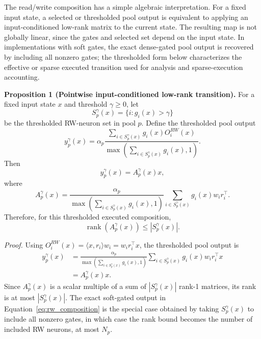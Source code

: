 \documentclass{article}
\begin{document}
The read/write composition has a simple algebraic interpretation. For a fixed input state, a selected or thresholded pool output is equivalent to applying an input-conditioned low-rank matrix to the current state. The resulting map is not globally linear, since the gates and selected set depend on the input state. In implementations with soft gates, the exact dense-gated pool output is recovered by including all nonzero gates; the thresholded form below characterizes the effective or sparse executed transition used for analysis and sparse-execution accounting.

\textbf{Proposition 1 (Pointwise input-conditioned low-rank transition).}
For a fixed input state $x$ and threshold $\gamma \ge 0$, let
\begin{equation}
    S_p^{\gamma}(x)=\{i:g_i(x)>\gamma\}
\end{equation}
be the thresholded RW-neuron set in pool $p$. Define the thresholded pool output
\begin{equation}
    y_p^{\gamma}(x)
    =
    \alpha_p
    \frac{\sum_{i\in S_p^{\gamma}(x)} g_i(x) O_i^{RW}(x)}
    {\max\left(\sum_{i\in S_p^{\gamma}(x)} g_i(x),1\right)} .
\end{equation}
Then
\begin{equation}
    y_p^{\gamma}(x)=A_p^{\gamma}(x)x,
\end{equation}
where
\begin{equation}
    A_p^{\gamma}(x)
    =
    \frac{\alpha_p}{\max\left(\sum_{i\in S_p^{\gamma}(x)} g_i(x),1\right)}
    \sum_{i\in S_p^{\gamma}(x)} g_i(x) w_i r_i^{\top} .
\end{equation}
Therefore, for this thresholded executed composition,
\begin{equation}
    \operatorname{rank}(A_p^{\gamma}(x)) \le |S_p^{\gamma}(x)| .
\end{equation}

\textit{Proof.}
Using $O_i^{RW}(x)=\langle x,r_i\rangle w_i = w_i r_i^{\top}x$, the thresholded pool output is
\begin{equation}
\begin{aligned}
    y_p^{\gamma}(x)
    &=
    \frac{\alpha_p}{\max\left(\sum_{i\in S_p^{\gamma}(x)} g_i(x),1\right)}
    \sum_{i\in S_p^{\gamma}(x)} g_i(x) w_i r_i^{\top}x \\
    &= A_p^{\gamma}(x)x .
\end{aligned}
\end{equation}
Since $A_p^{\gamma}(x)$ is a scalar multiple of a sum of $|S_p^{\gamma}(x)|$ rank-1 matrices, its rank is at most $|S_p^{\gamma}(x)|$. The exact soft-gated output in Equation~\ref{eq:rw_composition} is the special case obtained by taking $S_p^{\gamma}(x)$ to include all nonzero gates, in which case the rank bound becomes the number of included RW neurons, at most $N_p$.
\end{document}
